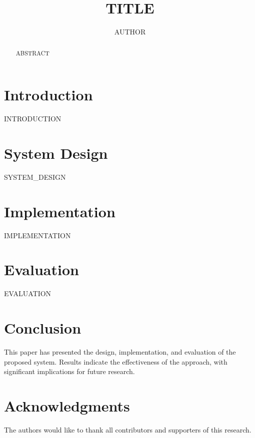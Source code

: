 \documentclass[sigconf]{acmart}
\begin{document}
\title{{{TITLE}}}

\author{{{AUTHOR}}}

\begin{abstract}
{{ABSTRACT}}
\end{abstract}


\maketitle

\section{Introduction}
{{INTRODUCTION}}

\section{System Design}
{{SYSTEM_DESIGN}}

\section{Implementation}
{{IMPLEMENTATION}}

\section{Evaluation}
{{EVALUATION}}

\section{Conclusion}
This paper has presented the design, implementation, and evaluation of the proposed system. Results indicate the effectiveness of the approach, with significant implications for future research.

\section{Acknowledgments}
The authors would like to thank all contributors and supporters of this research.



\end{document}
